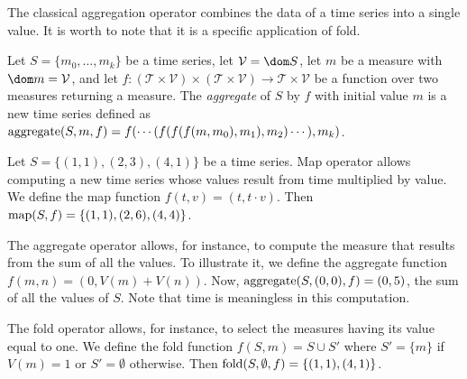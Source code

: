 The classical aggregation operator combines the data of a time series
into a single value.  It is worth to note that it is a specific
application of fold.

Let $S=\{m_0,\dots,m_k\}$ be a time series, let $\mathcal{V}=\dom S$,
let $m$ be a measure with $\dom m=\mathcal{V}$, and let 
%
$f:(\mathcal{T}\times\mathcal{V})\times(\mathcal{T}\times\mathcal{V})\rightarrow \mathcal{T}\times\mathcal{V}$ 
%
be a function over two measures returning a measure. The
\emph{aggregate} of $S$ by $f$ with initial value $m$ is a new time
series defined as $\operatorname*{aggregate}(S,m,f) = f(\cdots(f(f(f(m,m_0),\allowbreak
m_1),\allowbreak m_2)\cdots),\allowbreak m_k)$.  





\begin{example}
\label{ex:computational-operators}
Let $S=\{(1,1),(2,3),(4,1)\}$ be a time series.  Map operator allows
computing a new time series whose values result from time multiplied
by value.  We define the map function $f(t,v)=(t,t\cdot v)$. Then
$\operatorname*{map}(S,f)=\{(1,1),(2,6),(4,4)\}$.  
%

The aggregate operator allows, for instance, to compute the measure
that results from the sum of all the values.  To illustrate it, we
define the aggregate function $f(m,n)=(0,V(m)+V(n))$. Now,
$\operatorname*{aggregate}(S,(0,0),f) = (0,5)$, the sum of all the values of $S$. Note that
time is meaningless in this computation.

The fold operator allows, for instance, to select the measures having
its value equal to one.  We define the fold function $f(S,m)=S\cup S'$
where $S'=\{m\}$ if $V(m)=1$ or $S'=\emptyset$ otherwise. Then
$\operatorname*{fold}(S,\emptyset,f)=\{(1,1),(4,1)\}$.
\end{example}


